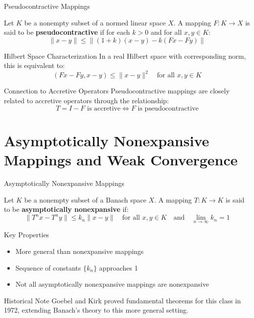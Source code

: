 \documentclass[aspectratio=169,10pt]{beamer}
\begin{document}
\begin{frame}[allowframebreaks]{Pseudocontractive Mappings}
    \begin{definition}[Definition 5.23]
        Let $K$ be a nonempty subset of a normed linear space $X$. A mapping $F: K \to X$ is said to be \textbf{pseudocontractive} if for each $k > 0$ and for all $x, y \in K$:
        \[
        \|x - y\| \le \|(1 + k)(x - y) - k(Fx - Fy)\|
        \]
    \end{definition}

    \begin{block}{Hilbert Space Characterization}
        In a real Hilbert space with corresponding norm, this is equivalent to:
        \[
        (Fx - Fy, x - y) \le \|x - y\|^2 \quad \text{for all } x, y \in K
        \]
    \end{block}

    \begin{block}{Connection to Accretive Operators}
        Pseudocontractive mappings are closely related to accretive operators through the relationship:
        \[
        T = I - F \text{ is accretive} \iff F \text{ is pseudocontractive}
        \]
    \end{block}
\end{frame}

\section{Asymptotically Nonexpansive Mappings and Weak Convergence}

\begin{frame}[allowframebreaks]{Asymptotically Nonexpansive Mappings}
    \begin{definition}[Definition 5.24]
        Let $K$ be a nonempty subset of a Banach space $X$. A mapping $T: K \to K$ is said to be \textbf{asymptotically nonexpansive} if:
        \[
        \|T^n x - T^n y\| \le k_n \|x - y\| \quad \text{for all } x, y \in K \quad \text{and} \quad \lim_{n \to \infty} k_n = 1
        \]
    \end{definition}

    \begin{block}{Key Properties}
        \begin{itemize}
            \item More general than nonexpansive mappings
            \item Sequence of constants $\{k_n\}$ approaches 1
            \item Not all asymptotically nonexpansive mappings are nonexpansive
        \end{itemize}
    \end{block}

    \begin{block}{Historical Note}
        Goebel and Kirk proved fundamental theorems for this class in 1972, extending Banach's theory to this more general setting.
    \end{block}
\end{frame}
\end{document}
